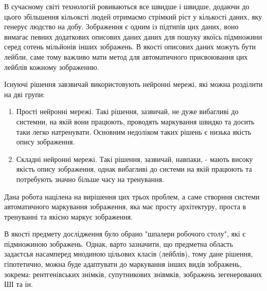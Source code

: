 \documentclass{udstu}
\begin{document}


В сучасному світі технологій ровиваються все швидше і швидше, додаючи до цього збільшення кільоксті людей
отримаємо стрімкий ріст у кількості даних, яку генерує людство на добу. Зображення є одним із підтипів цих даних,
воно вимагає певних додаткових описових даних даних для пошуку якоїсь підмножини серед сотень мільйонів інших зображень.
В якості описових даних можуть бути лейбли, саме тому важливо мати метод для автоматичного присвоювання цих лейблів
кожному зображенню.

Існуючі рішення завзвичай використовують нейронні мережі, які можна розділити на дві групи:

\begin{enumerate}[1)]
	\item Прості нейронні мережі. Такі рішення, зазвичай, не дуже вибагливі до
	системни, на якій вони працюють, проводять маркування швидко та досить таки легко натренувати.
	Основним недоліком таких рішень є низька якість опису зображення.

	\item Складні нейронні мережі. Такі рішення, зазвичай, навпаки, - мають високу якість опису зображення,
	однак вибагливі до системи на якій працюють та потребують значно більше часу на тренування.
\end{enumerate}

Дана робота націлена на вирішення цих трьох проблем, а саме створння системи автоматичного маркування зображення,
яка має просту архітектуру, проста в тренуванні та якісно маркує зображення.

В якості предмету дослідження було обрано "шпалери робочого столу", які є підмножиною зображень. Однак,
варто зазначити, що предметна область задаєтсья насамперед мнодиною цільових класів (лейблів), тому
дане рішення, гіпотетично, можна буде адаптувати до маркування інших видів зображень, зокрема: рентгенівських
знімків, супутникових знівмків, зображень зегенерованих ШІ та ін.
\end{document}
